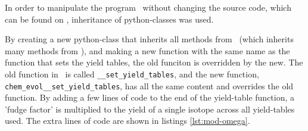 
\label{sec:mod-omega}

In order to manipulate the program \omegamodel\ without changing the source code, which can be found on , inheritance of python-classes was used.

By creating a new python-class that inherits all methods from \omegamodel\ (which inherits many methods from \chemevol ), and making a new function with the same name as the function that sets the yield tables, the old funciton is overridden by the new.
The old function in \chemevol\ is called \verb|__set_yield_tables|, and the new function, \verb|chem_evol__set_yield_tables|, has all the same content and overrides the old function. By adding a few lines of code to the end of the yield-table function, a 'fudge factor' is multiplied to the yield of a single isotope across all yield-tables used.
The extra lines of code are shown in listings \ref{lst:mod-omega}.

